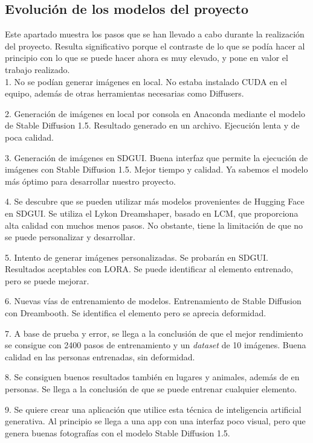 \begin{itemize}
\section{Evolución de los modelos del proyecto}

Este apartado muestra los pasos que se han llevado a cabo durante la realización del proyecto. Resulta significativo porque el contraste de lo que se podía hacer al principio con lo que se puede hacer ahora es muy elevado, y pone en valor el trabajo realizado.\\

1. No se podían generar imágenes en local. No estaba instalado CUDA en el equipo, además de otras herramientas necesarias como Diffusers.

2. Generación de imágenes en local por consola en Anaconda mediante el modelo de Stable Diffusion 1.5. Resultado generado en un archivo. Ejecución lenta y de poca calidad.

3. Generación de imágenes en SDGUI. Buena interfaz que permite la ejecución de imágenes con Stable Diffusion 1.5. Mejor tiempo y calidad. Ya sabemos el modelo más óptimo para desarrollar nuestro proyecto.

4. Se descubre que se pueden utilizar más modelos provenientes de Hugging Face en SDGUI. Se utiliza el Lykon Dreamshaper, basado en LCM, que proporciona alta calidad con muchos menos pasos. No obstante, tiene la limitación de que no se puede personalizar y desarrollar.

5. Intento de generar imágenes personalizadas. Se probarán en SDGUI. Resultados aceptables con LORA. Se puede identificar al elemento entrenado, pero se puede mejorar.

6. Nuevas vías de entrenamiento de modelos. Entrenamiento de Stable Diffusion con Dreambooth. Se identifica el elemento pero se aprecia deformidad.

7. A base de prueba y error, se llega a la conclusión de que el mejor rendimiento se consigue con 2400 pasos de entrenamiento y un \textit{dataset} de 10 imágenes. Buena calidad en las personas entrenadas, sin deformidad.

8. Se consiguen buenos resultados también en lugares y animales, además de en personas. Se llega a la conclusión de que se puede entrenar cualquier elemento.

9. Se quiere crear una aplicación que utilice esta técnica de inteligencia artificial generativa. Al principio se llega a una app con una interfaz poco visual, pero que genera buenas fotografías con el modelo Stable Diffusion 1.5.


\end{itemize}
